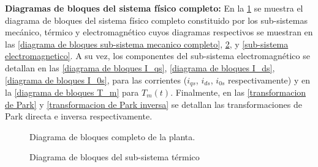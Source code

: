 \documentclass[a4paper, 10pt, onecolumn,journal]{ieeeconf}
\begin{document}
\textbf{Diagramas de bloques del sistema físico completo: } En la \cref{diagrama de bloques del sistema fisico} se muestra
el diagrama de bloques del sistema físico completo constituido por los sub-sistemas mecánico, térmico y electromagnético cuyos diagramas
respectivos se muestran en las \cref{diagrama de bloques sub-sistema mecanico completo}, \cref{subsistema termico},
y \cref{sub-sistema electromagnetico}. A su vez, los componentes del sub-sistema electromagnético se detallan
en las \cref{diagrama de bloques I_qs}, \cref{diagrama de bloques I_ds}, \cref{diagrama de bloques I_0s}, para las corrientes ($i_{qs}$, $i_{ds}$, $i_{0s}$ respectivamente) y en la \cref{diagrama de bloques T_m} para $T_m(t)$.
Finalmente, en las \cref{transformacion de Park} y \cref{transformacion de Park inversa} se detallan las transformaciones de Park directa e inversa respectivamente.

\begin{figure}[thpb]
    \centering
    \begin{adjustbox}{max width=\columnwidth}
    \end{adjustbox}
    \caption{Diagrama de bloques completo de la planta.}
    \label{diagrama de bloques del sistema fisico}
\end{figure}

\begin{figure}[thpb]
    \centering
    \begin{adjustbox}{max width=\columnwidth}
    \end{adjustbox}
    \caption{Diagrama de bloques del sub-sistema térmico}
    \label{subsistema termico}
\end{figure}
\end{document}

